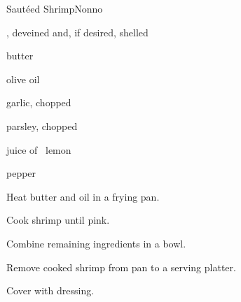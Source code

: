 \begin{recipe}{Sautéed Shrimp}{Nonno}{}

\begin{ingredients}
\item {}, deveined and, if desired, shelled
\item butter
\item olive oil
\item garlic, chopped
\item parsley, chopped
\item juice of \half~lemon
\item pepper
\end{ingredients}

\begin{directions}
\item Heat butter and oil in a frying pan.
\item Cook shrimp until pink.
\item Combine remaining ingredients in a bowl.
\item Remove cooked shrimp from pan to a serving platter.
\item Cover with dressing.
\end{directions}

\end{recipe}
